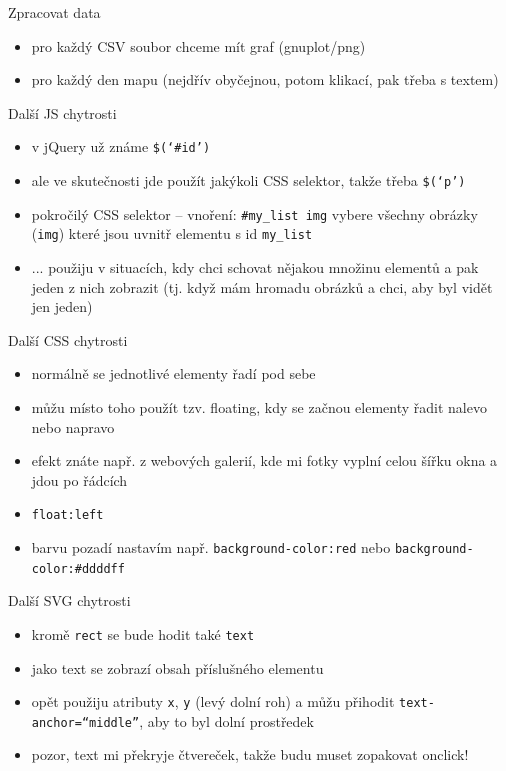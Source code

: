 \documentclass{beamer}
\begin{document}
\begin{frame}{Zpracovat data}
  \begin{itemize}
    \item pro každý CSV soubor chceme mít graf (gnuplot/png)
    \item pro každý den mapu (nejdřív obyčejnou, potom klikací, pak třeba s textem)
  \end{itemize}
\end{frame}

\begin{frame}{Další JS chytrosti}
  \begin{itemize}
    \item v jQuery už známe \texttt{\$(`\#id')}
    \item ale ve skutečnosti jde použít jakýkoli CSS selektor, takže třeba \texttt{\$(`p')}
    \item pokročilý CSS selektor -- vnoření: \texttt{\#my\_list img} vybere všechny obrázky (\texttt{img}) které jsou uvnitř elementu s id \texttt{my\_list}
    \item ... použiju v situacích, kdy chci schovat nějakou množinu elementů a pak jeden z nich zobrazit (tj. když mám hromadu obrázků a chci, aby byl vidět jen jeden)
  \end{itemize}
\end{frame}

\begin{frame}{Další CSS chytrosti}
  \begin{itemize}
    \item normálně se jednotlivé elementy řadí pod sebe
    \item můžu místo toho použít tzv. floating, kdy se začnou elementy řadit nalevo nebo napravo
    \item efekt znáte např. z webových galerií, kde mi fotky vyplní celou šířku okna a jdou po řádcích
    \item \texttt{float:left}
    \item barvu pozadí nastavím např. \texttt{background-color:red} nebo \texttt{background-color:\#ddddff}
  \end{itemize}
\end{frame}


\begin{frame}{Další SVG chytrosti}
  \begin{itemize}
    \item kromě \texttt{rect} se bude hodit také \texttt{text}
    \item jako text se zobrazí obsah příslušného elementu
    \item opět použiju atributy \texttt{x}, \texttt{y} (levý dolní roh) a můžu přihodit \texttt{text-anchor=``middle''}, aby to byl dolní prostředek
    \item pozor, text mi překryje čtvereček, takže budu muset zopakovat onclick!
  \end{itemize}
\end{frame}
\end{document}
